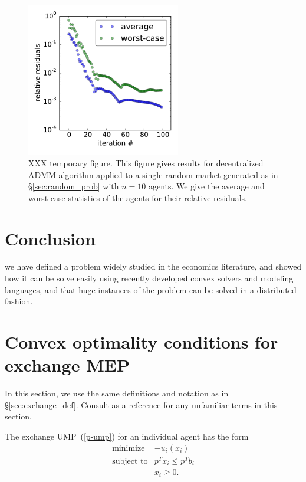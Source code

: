 \documentclass[12pt]{article}
\begin{document}
\begin{figure}
\begin{center}
\includegraphics[width=0.6\textwidth]{figures/admm}
\end{center}
\caption{XXX temporary figure. This figure gives results for decentralized ADMM algorithm applied to a single random market generated as in \S\ref{sec:random_prob} with $n=10$ agents. We give the average and worst-case statistics of the agents for their relative residuals.}
\label{f-admm}
\end{figure}

\section{Conclusion}
we have defined a problem widely studied in the economics literature, and showed how it can be solve easily using recently developed convex solvers and modeling languages, and that huge instances of the problem can be solved in a distributed fashion.


\appendix


\section{Convex optimality conditions for exchange MEP}
\label{sec:exchange_proof}
In this section, we use the same definitions and notation as in \S\ref{sec:exchange_def}.
Consult \cite{BoV:04} as a reference for any unfamiliar terms in this section.

The exchange UMP~(\ref{p-ump}) for an individual agent has the form
\[
\begin{array}{ll}
\mbox{minimize} & - u_i(x_i)\\
\mbox{subject to} & p^T x_i \leq p^T b_i\\
& x_i \geq 0.
\end{array}
\]
\end{document}
